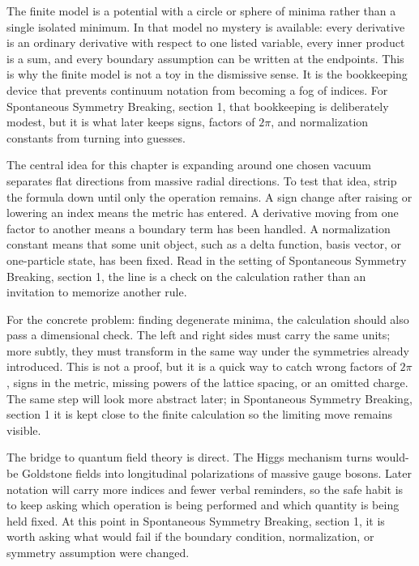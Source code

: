 The finite model is a potential with a circle or sphere of minima rather than a single isolated minimum.  In that model no mystery is available: every derivative is an ordinary derivative with respect to one listed variable, every inner product is a sum, and every boundary assumption can be written at the endpoints.  This is why the finite model is not a toy in the dismissive sense.  It is the bookkeeping device that prevents continuum notation from becoming a fog of indices.  For Spontaneous Symmetry Breaking, section 1, that bookkeeping is deliberately modest, but it is what later keeps signs, factors of \(2\pi\), and normalization constants from turning into guesses.

The central idea for this chapter is expanding around one chosen vacuum separates flat directions from massive radial directions.  To test that idea, strip the formula down until only the operation remains.  A sign change after raising or lowering an index means the metric has entered.  A derivative moving from one factor to another means a boundary term has been handled.  A normalization constant means that some unit object, such as a delta function, basis vector, or one-particle state, has been fixed.  Read in the setting of Spontaneous Symmetry Breaking, section 1, the line is a check on the calculation rather than an invitation to memorize another rule.

For the concrete problem: finding degenerate minima, the calculation should also pass a dimensional check.  The left and right sides must carry the same units; more subtly, they must transform in the same way under the symmetries already introduced.  This is not a proof, but it is a quick way to catch wrong factors of \(2\pi\), signs in the metric, missing powers of the lattice spacing, or an omitted charge.  The same step will look more abstract later; in Spontaneous Symmetry Breaking, section 1 it is kept close to the finite calculation so the limiting move remains visible.

The bridge to quantum field theory is direct.  The Higgs mechanism turns would-be Goldstone fields into longitudinal polarizations of massive gauge bosons.  Later notation will carry more indices and fewer verbal reminders, so the safe habit is to keep asking which operation is being performed and which quantity is being held fixed.  At this point in Spontaneous Symmetry Breaking, section 1, it is worth asking what would fail if the boundary condition, normalization, or symmetry assumption were changed.


